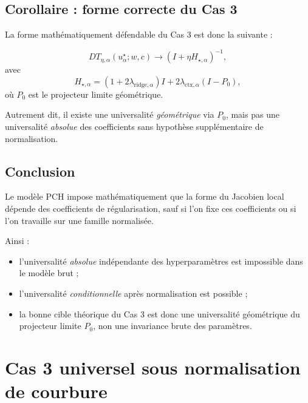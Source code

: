 \subsection{Corollaire : forme correcte du Cas 3}

La forme mathématiquement défendable du Cas 3 est donc la suivante :

\[
DT_{\eta,\alpha}(u_\alpha^\star;w,c)
\to
(I+\eta H_{\star,\alpha})^{-1},
\]
avec
\[
H_{\star,\alpha}
=
(1+2\lambda_{\mathrm{ridge},\alpha})I
+
2\lambda_{\mathrm{ctx},\alpha}(I-P_0),
\]
où \(P_0\) est le projecteur limite géométrique.

Autrement dit, il existe une universalité \emph{géométrique} via \(P_0\), mais pas une universalité \emph{absolue} des coefficients sans hypothèse supplémentaire de normalisation.

\subsection{Conclusion}

Le modèle PCH impose mathématiquement que la forme du Jacobien local dépende des coefficients de régularisation, sauf si l'on fixe ces coefficients ou si l'on travaille sur une famille normalisée.

Ainsi :

\begin{itemize}
    \item l'universalité \emph{absolue} indépendante des hyperparamètres est impossible dans le modèle brut ;
    \item l'universalité \emph{conditionnelle} après normalisation est possible ;
    \item la bonne cible théorique du Cas 3 est donc une universalité géométrique du projecteur limite \(P_0\), non une invariance brute des paramètres.
\end{itemize}






\section{Cas 3 universel sous normalisation de courbure}

